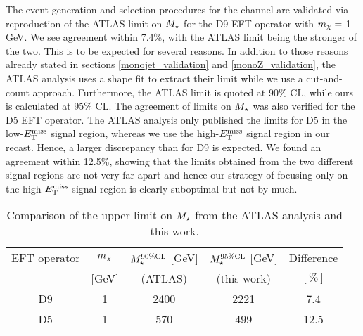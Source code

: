 The event generation and selection procedures for the \monoWZ channel are validated via reproduction of the ATLAS limit on $M_{\star}$ for the D9 EFT operator with $m_{\chi} = $ 1 GeV. We see agreement within 7.4\%, with the ATLAS limit being the stronger of the two. This is to be expected for several reasons. In addition to those reasons already stated in sections \ref{monojet_validation} and \ref{monoZ_validation}, the ATLAS analysis uses a shape fit to extract their limit while we use a cut-and-count approach. Furthermore, the ATLAS limit is quoted at 90\% CL, while ours is calculated at 95\% CL.
The agreement of limits on $M_{\star}$ was also verified for the D5 EFT operator. The ATLAS \monoWZ analysis only published the limits for D5 in the low-$E_{\mathrm{T}}^{\mathrm{miss}}$ signal region, whereas we use the high-$E_{\mathrm{T}}^{\mathrm{miss}}$ signal region in our recast. Hence, a larger discrepancy than for D9 is expected. We found an agreement within 12.5\%, showing that the limits obtained from the two different signal regions are not very far apart and hence our strategy of focusing only on the high-$E_{\mathrm{T}}^{\mathrm{miss}}$ signal region is clearly suboptimal but not by much.

\begin{table}
\begin{center}
\begin{tabular}{ c | c | c | c | c }
\hline
\hline
EFT operator & $m_{\chi}$ & $M_{\star}^{90\%\mathrm{CL}}$ $[$GeV$]$ & $M_{\star}^{95\%\mathrm{CL}}$ $[$GeV$]$  & Difference \T \\
&$[$GeV$]$ & (ATLAS) & (this work) & $[\%]$ \B \\
\hline
D9 & 1 & 2400 & 2221 & 7.4 \\
D5 & 1 & 570 & 499 & 12.5 \\
\hline
\hline
\end{tabular}
\end{center}
\caption{Comparison of the upper limit on $M_{\star}$ from the ATLAS \monoWZ analysis \cite{Aad:2013monoWZ} and this work.}
\label{tab:monoWZvalidation}
\end{table}
